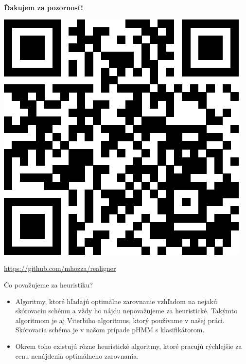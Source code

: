 \documentclass[xcolor=dvipsnames, compress, 12pt]{beamer}
\theoremstyle{definition}
\begin{document}
\section{}

\begin{frame}[plain, c]
  \transdissolve[duration=5]
  \begin{center}
  \textbf{\color{Green} \LARGE Ďakujem za pozornosť!}

  \vspace{1cm}

  \includegraphics[width=.30\textwidth]{images/realigner}

  \vspace{.5cm}

  \url{https://github.com/mhozza/realigner}
  \end{center}

\end{frame}



\begin{frame}{Čo považujeme za heuristiku?}
\begin{itemize}
  \item Algoritmy, ktoré hľadajú optimálne zarovnanie vzhľadom na nejakú skórovaciu schému a vždy ho nájdu nepovažujeme za heuristické. Takýmto algoritmom je aj Viterbiho algoritmus, ktorý používame v našej práci. Skórovacia schéma je v našom prípade pHMM s klasifikátorom.
  \item Okrem toho existujú rôzne heuristické algoritmy, ktoré pracujú rýchlejšie za cenu nenájdenia optimálneho zarovnania.
  \end{itemize}
\end{frame}
\end{document}
